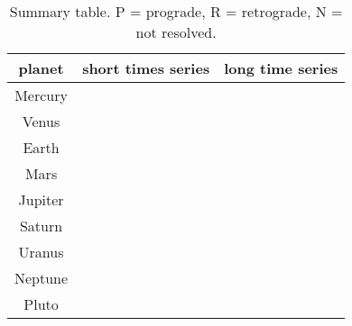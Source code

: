 \documentclass[11pt,titlepage,fleqn]{article}
\begin{document}
%

\begin{table}[h]
\centering
\caption[]
{{
Summary table. P = prograde, R = retrograde, N = not resolved.
\label{tab:planets}
}}
\tgap
\begin{tabular}{|c|c|c|}
\hline
planet & short times series & long time series \\ \hline
Mercury & & \\ \hline
Venus & & \\ \hline
Earth & & \\ \hline
Mars & & \\ \hline
Jupiter & & \\ \hline
Saturn & & \\ \hline
Uranus & & \\ \hline
Neptune & & \\ \hline
Pluto & & \\ \hline
\end{tabular}
\end{table}

\end{document}
